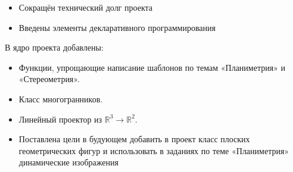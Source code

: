\documentclass[a4paper, 12pt]{extarticle}
\begin{document}
\begin{itemize}
\item Сокращён технический долг проекта
\item Введены элементы декларативного программирования
\end{itemize}
В ядро проекта добавлены:
\begin{itemize}
	\item Функции, упрощающие написание шаблонов по темам «Планиметрия» и  «Стереометрия».
	\item Класс многогранников.
	\item Линейный проектор из $\mathbb{R}^3 \to \mathbb{R}^2$.
	\item Поставлена цели в будующем добавить в проект класс плоских геометрических фигур и использовать в заданиях по теме «Планиметрия» динамические изображения
\end{itemize}
\end{document}
